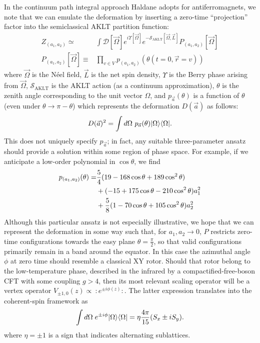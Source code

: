 \documentclass[aps,prb,letterpaper,superscriptaddress,twocolumn,showpacs,floatfix,10pt]{revtex4-1}
\begin{document}
In the continuum path integral approach Haldane adopts for
antiferromagnets\cite{Haldane2D}, we
note that we can emulate the deformation by inserting a zero-time
``projection'' factor into the semiclassical AKLT partition function:
\begin{align}
Z_{(a_1,a_2)} \simeq& \int \mathcal{D}[\vec{\Omega}]e^{i\Upsilon[\vec\Omega]}e^{-\mathcal{S}_\text{AKLT}[\vec{\Omega},\vec{L}]}P_{(a_1,a_2)}[\vec\Omega]\\
P_{(a_1,a_2)}[\vec\Omega] \equiv& \prod_{v\in V}p_{(a_1,a_2)}\!\left(\theta(t=0,\vec{r}=v)\right)
\end{align}
where $\vec\Omega$ is the N\'eel field, $\vec{L}$ is the net spin density,
$\Upsilon$ is the Berry phase arising from $\vec\Omega$,
$\mathcal{S}_\text{AKLT}$ is the AKLT action (as a continuum approximation),
$\theta$ is the zenith angle corresponding to the unit vector $\Omega$, and
$p_{\vec{a}}(\theta)$ is a function of $\theta$ (even under
$\theta\to \pi-\theta$) which represents the deformation $D(\vec{a})$ as
follows:
\begin{equation}
D(\vec{a})^2 = \int d\Omega\ p_{\vec{a}}(\theta)\ket{\Omega}\bra{\Omega}.
\end{equation}
This does not uniquely specify $p_{\vec{a}}$; in fact, any suitable
three-parameter ansatz should provide a solution within some region of phase
space. For example, if we anticipate a low-order polynomial in $\cos\theta$, we
find
\begin{align}
p_{(a_1,a_2)}(\theta) =&\frac{5}{4}(19-168\cos\theta+189\cos^2\theta)\\
&+(-15+175\cos\theta-210\cos^2\theta)a_1^2\notag\\
&+\frac{5}{8}(1-70\cos\theta+105\cos^2\theta)a_2^2\notag
\end{align}
Although this particular ansatz is not especially illustrative, we
hope that we can represent the deformation in some way such that, for
$a_1,a_2 \to 0$, $P$ restricts zero-time configurations towards the easy plane
$\theta=\frac{\pi}{2}$, so that valid configurations primarily remain in a band around the
equator. In this case the azimuthal angle $\phi$ at zero time should resemble
a classical XY rotor. Should that rotor belong to the low-temperature phase, 
described in the infrared by a compactified-free-boson CFT with some coupling
$g > 4$, then its most relevant scaling operator will be a vertex operator
$V_{\pm 1,0}(z)\propto\ :\mathrel{e^{\pm i\phi(z)}}:$. The
latter expression translates into the coherent-spin framework as
\begin{equation}
\int d\Omega\;e^{\pm i \phi}\vert\Omega\rangle\langle\Omega\vert = \eta\frac{4\pi}{15}(S_x\pm iS_y).
\end{equation}
where $\eta = \pm 1$ is a sign that indicates alternating sublattices. 
\end{document}
